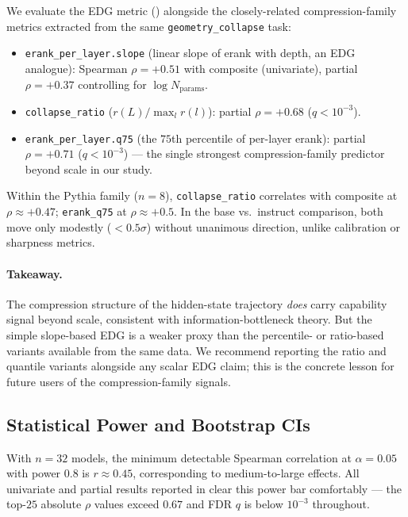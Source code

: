 \documentclass[preprint]{neurips_2025}
\begin{document}
We evaluate the EDG metric () alongside the closely-related compression-family metrics extracted from the same \texttt{geometry\_collapse} task:

\begin{itemize}
  \item \texttt{erank\_per\_layer.slope} (linear slope of erank with depth, an EDG analogue): Spearman $\rho = +0.51$ with composite (univariate), partial $\rho = +0.37$ controlling for $\log N_{\text{params}}$.
  \item \texttt{collapse\_ratio} ($r(L) / \max_l r(l)$): partial $\rho = +0.68$ ($q < 10^{-3}$).
  \item \texttt{erank\_per\_layer.q75} (the $75$th percentile of per-layer erank): partial $\rho = +0.71$ ($q < 10^{-3}$) --- the single strongest compression-family predictor beyond scale in our study.
\end{itemize}

Within the Pythia family ($n = 8$), \texttt{collapse\_ratio} correlates with composite at $\rho \approx +0.47$; \texttt{erank\_q75} at $\rho \approx +0.5$. In the base vs.\ instruct comparison, both move only modestly ($< 0.5\sigma$) without unanimous direction, unlike calibration or sharpness metrics.

\paragraph{Takeaway.}
The compression structure of the hidden-state trajectory \emph{does} carry capability signal beyond scale, consistent with information-bottleneck theory. But the simple slope-based EDG is a weaker proxy than the percentile- or ratio-based variants available from the same data. We recommend reporting the ratio and quantile variants alongside any scalar EDG claim; this is the concrete lesson for future users of the compression-family signals.

\subsection{Statistical Power and Bootstrap CIs}
\label{sec:power}

With $n = 32$ models, the minimum detectable Spearman correlation at $\alpha = 0.05$ with power $0.8$ is $r \approx 0.45$, corresponding to medium-to-large effects.
All univariate and partial results reported in  clear this power bar comfortably --- the top-$25$ absolute $\rho$ values exceed $0.67$ and FDR $q$ is below $10^{-3}$ throughout.
\end{document}
